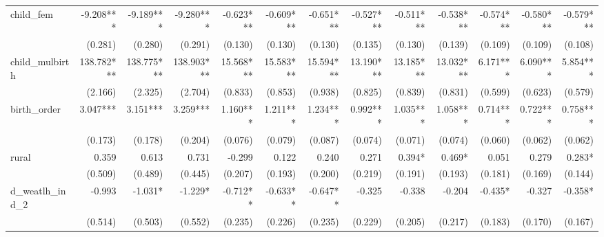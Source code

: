 \begin{tabular}{lrrrrrrrrrrrr}
child\_fem                                  &    -9.208*** &    -9.189*** &    -9.280*** &    -0.623*** &    -0.609*** &    -0.651*** &    -0.527*** &    -0.511*** &    -0.538*** &    -0.574*** &    -0.580*** &    -0.579*** \\ 
                                            &      (0.281) &      (0.280) &      (0.291) &      (0.130) &      (0.130) &      (0.130) &      (0.135) &      (0.130) &      (0.139) &      (0.109) &      (0.109) &      (0.108) \\ 
child\_mulbirth                             &   138.782*** &   138.775*** &   138.903*** &    15.568*** &    15.583*** &    15.594*** &    13.190*** &    13.185*** &    13.032*** &     6.171*** &     6.090*** &     5.854*** \\ 
                                            &      (2.166) &      (2.325) &      (2.704) &      (0.833) &      (0.853) &      (0.938) &      (0.825) &      (0.839) &      (0.831) &      (0.599) &      (0.623) &      (0.579) \\ 
birth\_order                                &     3.047*** &     3.151*** &     3.259*** &     1.160*** &     1.211*** &     1.234*** &     0.992*** &     1.035*** &     1.058*** &     0.714*** &     0.722*** &     0.758*** \\ 
                                            &      (0.173) &      (0.178) &      (0.204) &      (0.076) &      (0.079) &      (0.087) &      (0.074) &      (0.071) &      (0.074) &      (0.060) &      (0.062) &      (0.062) \\ 
rural                                       &        0.359 &        0.613 &        0.731 &       -0.299 &        0.122 &        0.240 &        0.271 &       0.394* &       0.469* &        0.051 &        0.279 &       0.283* \\ 
                                            &      (0.509) &      (0.489) &      (0.445) &      (0.207) &      (0.193) &      (0.200) &      (0.219) &      (0.191) &      (0.193) &      (0.181) &      (0.169) &      (0.144) \\ 
d\_weatlh\_ind\_2                           &       -0.993 &      -1.031* &      -1.229* &     -0.712** &     -0.633** &     -0.647** &       -0.325 &       -0.338 &       -0.204 &      -0.435* &       -0.327 &      -0.358* \\ 
                                            &      (0.514) &      (0.503) &      (0.552) &      (0.235) &      (0.226) &      (0.235) &      (0.229) &      (0.205) &      (0.217) &      (0.183) &      (0.170) &      (0.167) \\ 

\end{tabular}
